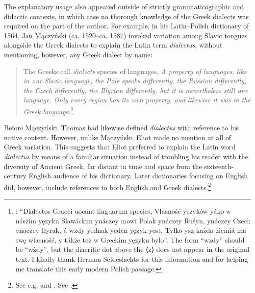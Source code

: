 The explanatory usage also appeared outside of strictly grammaticographic and didactic contexts, in which case no thorough knowledge of the Greek dialects was required on the part of the author. For example, in his Latin–Polish dictionary of 1564, Jan Mączyński (ca. 1520–ca. 1587) invoked variation among Slavic tongues alongside the Greek dialects to explain the Latin term \textit{dialectus}, without mentioning, however, any Greek dialect by name:

\begin{quote}
The Greeks call \textit{dialects} species of languages, \textit{A property of languages, like in our Slavic language, the Pole speaks differently, the Russian differently, the Czech differently, the Illyrian differently, but it is nevertheless still one language. Only every region has its own property, and likewise it was in the Greek language}.\footnote{\citet[ \textit{s.v.} “dialectus”]{Maczynski1564}: “Dialectos Graeci uocant linguarum species, Vlasność yęzyków yáko w nászim yęzyku Slawáckim ynáczey mowi Polak ynáczey Ruśyn, ynáczey Czech ynaczey Ilyrak, á wzdy yednak yeden yęzyk yest. Tylko ysz każda ziemiá ma swę wlasność, y tákże też w Greckim yęzyku bylo”. The form “wzdy” should be “wżdy”, but the diacritic dot above the ⟨z⟩ does not appear in the original text. I kindly thank Herman Seldeslachts for this information and for helping me translate this early modern Polish passage.}
\end{quote}

Before Mączyński, Thomas \citet[\textsc{xxxiii}\textsc{\textsuperscript{v}}]{Eliot1538} had likewise defined \textit{dialectus} with reference to his native context. However, unlike Mączyński, Eliot made no mention at all of Greek variation. This suggests that Eliot preferred to explain the Latin word \textit{dialectus} by means of a familiar situation instead of troubling his reader with the diversity of Ancient Greek, far distant in time and space from the sixteenth-century English audience of his dictionary. Later dictionaries focusing on English did, however, include references to both English and Greek dialects.\footnote{See e.g. \citet[\textit{s.v.} “dialect”]{Bullokar1616} and \citet[\textit{s.v.} “dialect”]{Blount1656}. See \citet[7]{Blank1996}.}


